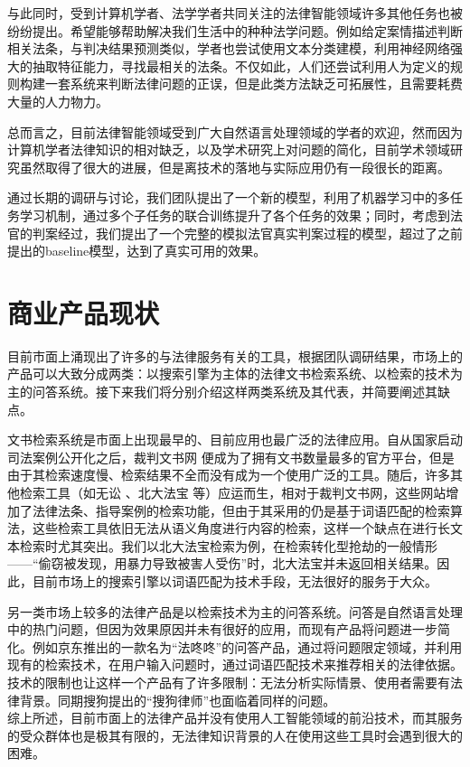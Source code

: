 
与此同时，受到计算机学者、法学学者共同关注的法律智能领域许多其他任务也被纷纷提出。希望能够帮助解决我们生活中的种种法学问题。例如给定案情描述判断相关法条，与判决结果预测类似，学者也尝试使用文本分类建模，利用神经网络强大的抽取特征能力，寻找最相关的法条。不仅如此，人们还尝试利用人为定义的规则构建一套系统来判断法律问题的正误，但是此类方法缺乏可拓展性，且需要耗费大量的人力物力。


总而言之，目前法律智能领域受到广大自然语言处理领域的学者的欢迎，然而因为计算机学者法律知识的相对缺乏，以及学术研究上对问题的简化，目前学术领域研究虽然取得了很大的进展，但是离技术的落地与实际应用仍有一段很长的距离。

通过长期的调研与讨论，我们团队提出了一个新的模型，利用了机器学习中的多任务学习机制，通过多个子任务的联合训练提升了各个任务的效果；同时，考虑到法官的判案经过，我们提出了一个完整的模拟法官真实判案过程的模型，超过了之前提出的baseline模型，达到了真实可用的效果。


\section{商业产品现状}
目前市面上涌现出了许多的与法律服务有关的工具，根据团队调研结果，市场上的产品可以大致分成两类：以搜索引擎为主体的法律文书检索系统、以检索的技术为主的问答系统。接下来我们将分别介绍这样两类系统及其代表，并简要阐述其缺点。

文书检索系统是市面上出现最早的、目前应用也最广泛的法律应用。自从国家启动司法案例公开化之后，裁判文书网 便成为了拥有文书数量最多的官方平台，但是由于其检索速度慢、检索结果不全而没有成为一个使用广泛的工具。随后，许多其他检索工具（如无讼 、北大法宝 等）应运而生，相对于裁判文书网，这些网站增加了法律法条、指导案例的检索功能，但由于其采用的仍是基于词语匹配的检索算法，这些检索工具依旧无法从语义角度进行内容的检索，这样一个缺点在进行长文本检索时尤其突出。我们以北大法宝检索为例，在检索转化型抢劫的一般情形——“偷窃被发现，用暴力导致被害人受伤”时，北大法宝并未返回相关结果。因此，目前市场上的搜索引擎以词语匹配为技术手段，无法很好的服务于大众。

另一类市场上较多的法律产品是以检索技术为主的问答系统。问答是自然语言处理中的热门问题，但因为效果原因并未有很好的应用，而现有产品将问题进一步简化。例如京东推出的一款名为“法咚咚”的问答产品，通过将问题限定领域，并利用现有的检索技术，在用户输入问题时，通过词语匹配技术来推荐相关的法律依据。技术的限制也让这样一个产品有了许多限制：无法分析实际情景、使用者需要有法律背景。同期搜狗提出的“搜狗律师”也面临着同样的问题。\\

综上所述，目前市面上的法律产品并没有使用人工智能领域的前沿技术，而其服务的受众群体也是极其有限的，无法律知识背景的人在使用这些工具时会遇到很大的困难。

